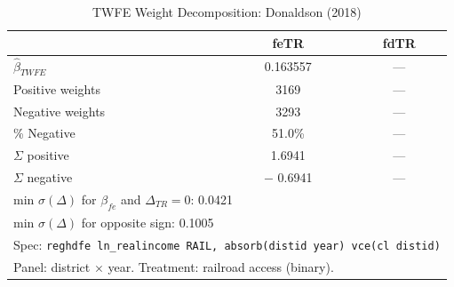\begin{table}[htbp]
\centering
\caption{TWFE Weight Decomposition: Donaldson (2018)}
\label{tab:donaldson_weights}
\begin{tabular}{lcc}
\hline\hline
 & feTR & fdTR \\
\hline
$\hat{\beta}_{TWFE}$ &     0.163557 & --- \\
Positive weights &      3169 & --- \\
Negative weights &      3293 & --- \\
\% Negative &  51.0\% & --- \\
$\Sigma$ positive &    1.6941 & --- \\
$\Sigma$ negative & $-$   0.6941 & --- \\
\hline
\multicolumn{3}{l}{\footnotesize min $\sigma(\Delta)$ for $\beta_{fe}$ and $\Delta_{TR}=0$:    0.0421} \\
\multicolumn{3}{l}{\footnotesize min $\sigma(\Delta)$ for opposite sign:    0.1005} \\
\hline
\multicolumn{3}{l}{\footnotesize Spec: \texttt{reghdfe ln\_realincome RAIL, absorb(distid year) vce(cl distid)}} \\
\multicolumn{3}{l}{\footnotesize Panel: district $\times$ year. Treatment: railroad access (binary).} \\
\hline\hline
\end{tabular}
\end{table}
